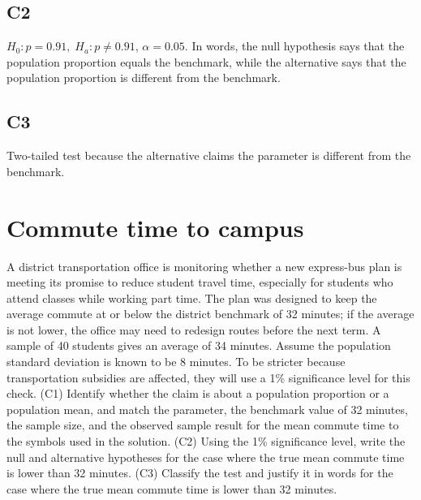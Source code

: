 \begin{ExamProblems}
		\subsection*{C2}
		\(H_0\colon p=0.91,\; H_a\colon p\ne 0.91\), \(\alpha=0.05\). In words, the null hypothesis says that the population proportion equals the benchmark, while the alternative says that the population proportion is different from the benchmark.
		
		\subsection*{C3}
		Two-tailed test because the alternative claims the parameter is different from the benchmark.\TwoTailGraph
		
		\item
		\section{Commute time to campus}
		A district transportation office is monitoring whether a new express-bus plan is meeting its promise to reduce student travel time, especially for students who attend classes while working part time. The plan was designed to keep the average commute at or below the district benchmark of 32 minutes; if the average is not lower, the office may need to redesign routes before the next term. A sample of 40 students gives an average of 34 minutes. Assume the population standard deviation is known to be 8 minutes. To be stricter because transportation subsidies are affected, they will use a 1\% significance level for this check. (C1) Identify whether the claim is about a population proportion or a population mean, and match the parameter, the benchmark value of 32 minutes, the sample size, and the observed sample result for the mean commute time to the symbols used in the solution. (C2) Using the 1\% significance level, write the null and alternative hypotheses for the case where the true mean commute time is lower than 32 minutes. (C3) Classify the test and justify it in words for the case where the true mean commute time is lower than 32 minutes.
		

\end{ExamProblems}
